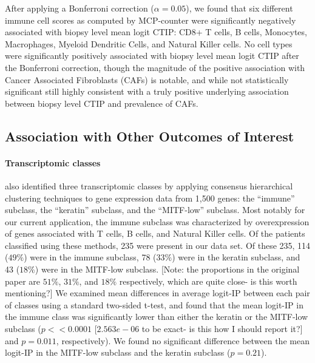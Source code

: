 \documentclass[
]{book}
\begin{document}
After applying a Bonferroni correction (\(\alpha = 0.05\)), we found that six different immune cell scores as computed by MCP-counter were significantly negatively associated with biopsy level mean logit CTIP: CD8+ T cells, B cells, Monocytes, Macrophages, Myeloid Dendritic Cells, and Natural Killer cells. No cell types were significantly positively associated with biopsy level mean logit CTIP after the Bonferroni correction, though the magnitude of the positive association with Cancer Associated Fibroblasts (CAFs) is notable, and while not statistically significant still highly consistent with a truly positive underlying association between biopsy level CTIP and prevalence of CAFs.

\hypertarget{association-with-other-outcomes-of-interest}{%
\subsection{Association with Other Outcomes of Interest}\label{association-with-other-outcomes-of-interest}}

\paragraph{\textbf{Transcriptomic classes}}

\citet{Akbani15} also identified three transcriptomic classes by applying consensus hierarchical clustering techniques to gene expression data from 1,500 genes: the ``immune'' subclass, the ``keratin'' subclass, and the ``MITF-low'' subclass. Most notably for our current application, the immune subclass was characterized by overexpression of genes associated with T cells, B cells, and Natural Killer cells. Of the patients classified using these methods, 235 were present in our data set. Of these 235, 114 (\(49\%\)) were in the immune subclass, 78 (\(33\%\)) were in the keratin subclass, and 43 (\(18\%\)) were in the MITF-low subclass. {[}Note: the proportions in the original paper are \(51\%\), \(31\%\), and \(18\%\) respectively, which are quite close- is this worth mentioning?{]} We examined mean differences in average logit-IP between each pair of classes using a standard two-sided t-test, and found that the mean logit-IP in the immune class was significantly lower than either the keratin or the MITF-low subclass (\(p << 0.0001\) {[}\(2.563e-06\) to be exact- is this how I should report it?{]} and \(p = 0.011\), respectively). We found no significant difference between the mean logit-IP in the MITF-low subclass and the keratin subclass (\(p = 0.21\)).
\end{document}
